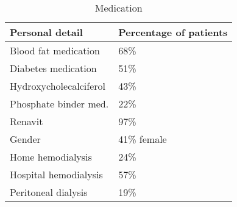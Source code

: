 \documentclass[border=1mm, preview]{standalone}
\begin{document}
\begin{table}

\caption{\label{tab:table2}Medication}
\centering
\begin{tabu} to 
\toprule
\textbf{Personal detail} & \textbf{Percentage of patients}\\
\midrule
Blood fat medication & 68\%\\
Diabetes medication & 51\%\\
Hydroxycholecalciferol & 43\%\\
Phosphate binder med. & 22\%\\
Renavit & 97\%\\
\addlinespace
Gender & 41\% female\\
Home hemodialysis & 24\%\\
Hospital hemodialysis & 57\%\\
Peritoneal dialysis & 19\%\\
\bottomrule
\end{tabu}
\end{table}
\end{document}
